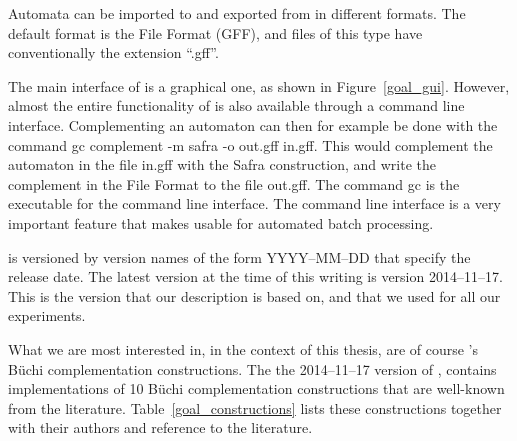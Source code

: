 Automata can be imported to and exported from \goal{} in different formats. The default format is the \goal{} File Format (GFF), and files of this type have conventionally the extension ``.gff''. 

The main interface of \goal{} is a graphical one, as shown in Figure~\ref{goal_gui}. However, almost the entire functionality of \goal{} is also available through a command line interface. Complementing an automaton can then for example be done with the command \textsf{gc complement -m safra -o out.gff in.gff}. This would complement the automaton in the file \textsf{in.gff} with the Safra construction, and write the complement in the \goal{} File Format to the file \textsf{out.gff}. The command \textsf{gc} is the \goal{} executable for the command line interface. The command line interface is a very important feature that makes \goal{} usable for automated batch processing.

\goal{} is versioned by version names of the form YYYY--MM--DD that specify the release date. The latest version at the time of this writing is version 2014--11--17. This is the version that our description is based on, and that we used for all our experiments.

What we are most interested in, in the context of this thesis, are of course \goal's Büchi complementation constructions. The the 2014--11--17 version of \goal{}, contains implementations of 10 Büchi complementation constructions that are well-known from the literature. Table~\ref{goal_constructions} lists these constructions together with their authors and reference to the literature.

